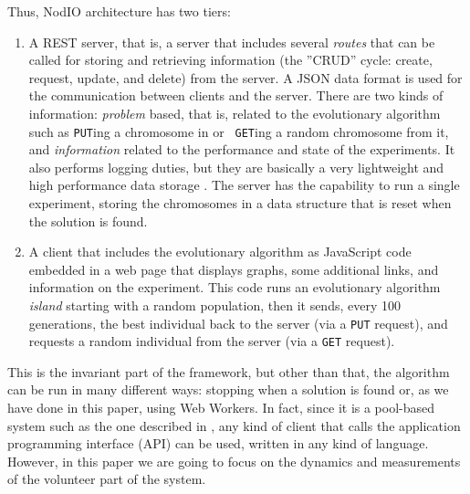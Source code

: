 \documentclass[journal,onecolumn]{IEEEtran}
\begin{document}


Thus, {\sf NodIO} architecture has two tiers:\begin{enumerate}
\item A REST server, that is, a server that includes several {\em
  routes} 
  that can be called for storing and retrieving information (the ''CRUD'' cycle:
  create, request, update, and delete) from the server. 
  A JSON data format is used for the communication between 
  clients and the server. There are two kinds of information:
  {\em problem} based, that is, related to the
  evolutionary algorithm such as {\tt PUT}ing a chromosome in or {\tt
  GET}ing a random chromosome from it, and {\em information} related
  to the performance and state of the experiments. It also performs logging
  duties, but they are basically a very lightweight and high performance
  data storage \cite{jj:idc:lowcost}.
  The server has the capability to
  run a single experiment, storing the chromosomes in a data structure
  that is reset when the solution is found.
\item A client that includes the evolutionary algorithm as
  JavaScript code embedded in a web page that displays graphs, some
  additional links, and information on the experiment. This code runs
  an evolutionary algorithm {\em island} starting with a random
  population, then it sends, every 100 generations, the best individual
  back to the server (via a {\tt PUT} request), and requests a random
  individual from the server (via a {\tt GET} request). %
\end{enumerate}


  This is the invariant part of the framework, but other than that,
  the algorithm can be run in many different ways: 
  stopping when a solution is found or, as we have done in this paper,
  using Web Workers. In fact, since it is a pool-based system such as
  the one described in \cite{LNCS86720702}, any kind of client that
  calls the application programming interface (API) can be used, %
  written in any kind of language. However, in this paper we are going
  to focus on the dynamics and measurements of the volunteer part of
  the system. 
\end{document}
